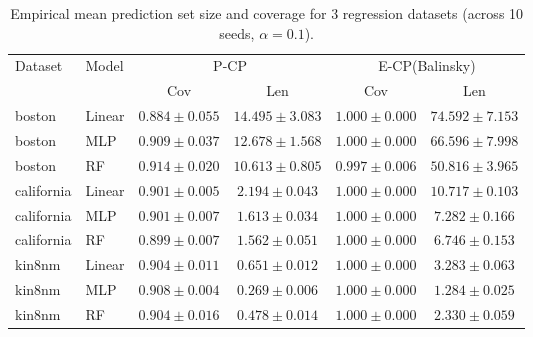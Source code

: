 \documentclass{article}
\theoremstyle{plain}
\theoremstyle{definition}
\theoremstyle{remark}
\begin{document}
\begin{table}[h]
\centering
\begin{tabular}{llcccc}
\toprule
\multirow{2}{*}{Dataset} & \multirow{2}{*}{Model} & \multicolumn{2}{c}{P-CP} & \multicolumn{2}{c}{E-CP(Balinsky)} \\
\cmidrule(lr){3-4}\cmidrule(lr){5-6}
 &  & Cov & Len & Cov & Len \\
\midrule
boston     & Linear & $0.884 \pm 0.055$ & $14.495 \pm 3.083$ & $1.000 \pm 0.000$ & $74.592 \pm 7.153$ \\
boston     & MLP    & $0.909 \pm 0.037$ & $12.678 \pm 1.568$ & $1.000 \pm 0.000$ & $66.596 \pm 7.998$ \\
boston     & RF     & $0.914 \pm 0.020$ & $10.613 \pm 0.805$ & $0.997 \pm 0.006$ & $50.816 \pm 3.965$ \\
\addlinespace
california & Linear & $0.901 \pm 0.005$ & $2.194 \pm 0.043$  & $1.000 \pm 0.000$ & $10.717 \pm 0.103$ \\
california & MLP    & $0.901 \pm 0.007$ & $1.613 \pm 0.034$  & $1.000 \pm 0.000$ & $7.282 \pm 0.166$ \\
california & RF     & $0.899 \pm 0.007$ & $1.562 \pm 0.051$  & $1.000 \pm 0.000$ & $6.746 \pm 0.153$ \\
\addlinespace
kin8nm     & Linear & $0.904 \pm 0.011$ & $0.651 \pm 0.012$  & $1.000 \pm 0.000$ & $3.283 \pm 0.063$ \\
kin8nm     & MLP    & $0.908 \pm 0.004$ & $0.269 \pm 0.006$  & $1.000 \pm 0.000$ & $1.284 \pm 0.025$ \\
kin8nm     & RF     & $0.904 \pm 0.016$ & $0.478 \pm 0.014$  & $1.000 \pm 0.000$ & $2.330 \pm 0.059$ \\
\bottomrule
\end{tabular}
\caption{Empirical mean prediction set size and coverage for 3 regression datasets (across 10 seeds, $\alpha=0.1$).}
\label{appendix:table_regression}
\end{table}
\end{document}
